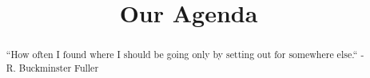 \documentclass{ximera}
\title{Our Agenda}
\begin{document}
\begin{abstract}
``How often I found where I should be going only by setting out for somewhere else.`` - R. Buckminster Fuller
\end{abstract}
\maketitle
\end{document}
